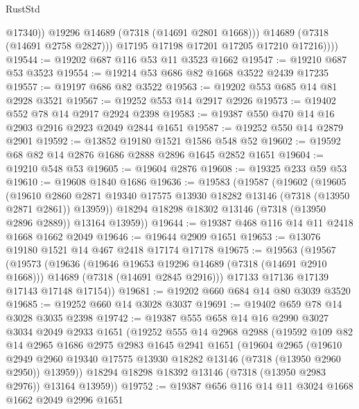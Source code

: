 \begin{lexlean}{RustStd}
\begin{coremodule}
                    @17340))
                @19296
                @14689
                (@7318 (@14691 @2801 @1668)))
              @14689
              (@7318 (@14691 @2758 @2827)))
            @17195
            @17198
            @17201
            @17205
            @17210
            @17216))))
@19544 := @19202 @687 @116 @53 @11 @3523 @1662
@19547 := @19210 @687 @53 @3523
@19554 := @19214 @53 @686 @82 @1668 @3522 @2439 @17235
@19557 := @19197 @686 @82 @3522
@19563 := @19202 @553 @685 @14 @81 @2928 @3521
@19567 := @19252 @553 @14 @2917 @2926
@19573 := @19402 @552 @78 @14 @2917 @2924 @2398
@19583 := @19387 @550 @470 @14 @16 @2903 @2916 @2923 @2049 @2844 @1651
@19587 := @19252 @550 @14 @2879 @2901
@19592 := @13852 @19180 @1521 @1586 @548 @52
@19602 := @19592 @68 @82 @14 @2876 @1686 @2888 @2896 @1645 @2852 @1651
@19604 := @19210 @548 @53
@19605 := @19604 @2876
@19608 := @19325 @233 @59 @53
@19610 := @19608 @1840 @1686
@19636 := @19583
    (@19587
      (@19602
        (@19605
          (@19610
            @2860
            @2871
            @19340
            @17575
            @13930
            @18282
            @13146
            (@7318 (@13950 @2871 @2861))
            @13959))
        @18294
        @18298
        @18302
        @13146
        (@7318 (@13950 @2896 @2889))
        @13164
        @13959))
@19644 := @19387 @468 @116 @14 @11 @2418 @1668 @1662 @2049
@19646 := @19644 @2909 @1651
@19653 := @13076 @19180 @1521 @14 @467 @2418 @17174 @17178
@19675 := @19563
    (@19567
      (@19573
        (@19636
          (@19646 @19653 @19296 @14689 (@7318 (@14691 @2910 @1668)))
          @14689
          (@7318 (@14691 @2845 @2916)))
        @17133
        @17136
        @17139
        @17143
        @17148
        @17154))
@19681 := @19202 @660 @684 @14 @80 @3039 @3520
@19685 := @19252 @660 @14 @3028 @3037
@19691 := @19402 @659 @78 @14 @3028 @3035 @2398
@19742 := @19387
    @555
    @658
    @14
    @16
    @2990
    @3027
    @3034
    @2049
    @2933
    @1651
    (@19252
      @555
      @14
      @2968
      @2988
      (@19592
        @109
        @82
        @14
        @2965
        @1686
        @2975
        @2983
        @1645
        @2941
        @1651
        (@19604
          @2965
          (@19610
            @2949
            @2960
            @19340
            @17575
            @13930
            @18282
            @13146
            (@7318 (@13950 @2960 @2950))
            @13959))
        @18294
        @18298
        @18392
        @13146
        (@7318 (@13950 @2983 @2976))
        @13164
        @13959))
@19752 := @19387 @656 @116 @14 @11 @3024 @1668 @1662 @2049 @2996 @1651

\end{coremodule}
\end{lexlean}
